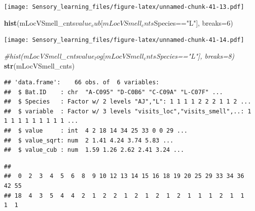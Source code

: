 \documentclass[]{article}
\newenvironment{Shaded}{\begin{snugshade}}{\end{snugshade}}
\newcommand{\KeywordTok}[1]{\textcolor[rgb]{0.13,0.29,0.53}{\textbf{{#1}}}}
\newcommand{\DataTypeTok}[1]{\textcolor[rgb]{0.13,0.29,0.53}{{#1}}}
\newcommand{\DecValTok}[1]{\textcolor[rgb]{0.00,0.00,0.81}{{#1}}}
\newcommand{\StringTok}[1]{\textcolor[rgb]{0.31,0.60,0.02}{{#1}}}
\newcommand{\CommentTok}[1]{\textcolor[rgb]{0.56,0.35,0.01}{\textit{{#1}}}}
\newcommand{\NormalTok}[1]{{#1}}
\begin{document}
\texttt{[image: Sensory\_learning\_files/figure-latex/unnamed-chunk-41-13.pdf]}

\begin{Shaded}
\begin{Highlighting}[]
\KeywordTok{hist}\NormalTok{(mLocVSmell_cnts$value_cub[mLocVSmell_cnts$Species==}\StringTok{"L"}\NormalTok{], }\DataTypeTok{breaks=}\DecValTok{6}\NormalTok{)}
\end{Highlighting}
\end{Shaded}

\texttt{[image: Sensory\_learning\_files/figure-latex/unnamed-chunk-41-14.pdf]}

\begin{Shaded}
\begin{Highlighting}[]
\CommentTok{#hist(mLocVSmell_cnts$value_log[mLocVSmell_cnts$Species=="L"], breaks=8)}
\KeywordTok{str}\NormalTok{(mLocVSmell_cnts)}
\end{Highlighting}
\end{Shaded}

\begin{verbatim}
## 'data.frame':    66 obs. of  6 variables:
##  $ Bat.ID    : chr  "A-C095" "D-C0B6" "C-C09A" "L-C07F" ...
##  $ Species   : Factor w/ 2 levels "AJ","L": 1 1 1 1 2 2 2 1 1 2 ...
##  $ variable  : Factor w/ 3 levels "visits_loc","visits_smell",..: 1 1 1 1 1 1 1 1 1 1 ...
##  $ value     : int  4 2 18 14 34 25 33 0 0 29 ...
##  $ value_sqrt: num  2 1.41 4.24 3.74 5.83 ...
##  $ value_cub : num  1.59 1.26 2.62 2.41 3.24 ...
\end{verbatim}

\begin{Shaded}
\end{Shaded}

\begin{verbatim}
## 
##  0  2  3  4  5  6  8  9 10 12 13 14 15 16 18 19 20 25 29 33 34 36 42 55 
## 18  4  3  5  4  4  2  1  2  2  1  2  1  2  1  2  1  1  1  2  1  1  1  1
\end{verbatim}

\begin{Shaded}
\end{Shaded}
\end{document}
